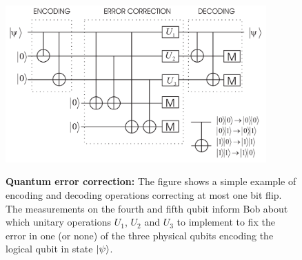 \documentclass[a4paper]{article}
\begin{document}
\begin{figure}
\begin{center}
  \includegraphics[width=10cm]{errcorr}\\
  \caption{\textbf{Quantum error correction:} The figure shows a simple example of encoding and decoding operations correcting at most one bit flip.
  The measurements on the fourth and fifth qubit inform Bob about which unitary operations $U_1$, $U_2$ and $U_3$ to implement to fix the error in one (or none) of the three physical qubits encoding the logical qubit
  in state $|\psi\rangle$.}\label{errc}
  \end{center}
\end{figure}
\end{document}
